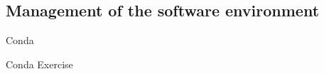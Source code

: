\subsection{Management of the software environment}

\begin{frame}{}
    \huge{Conda}
\end{frame}
%

\begin{frame}{}
    \huge{Conda Exercise}
\end{frame}


